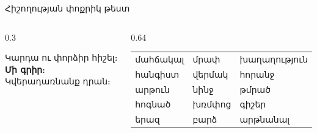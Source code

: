 
\begin{frame}{Հիշողության փոքրիկ թեստ}
  \begin{columns}[c]
    \begin{column}{0.3\textwidth}
      \centering
      \par\medskip
      Կարդա ու փորձիր հիշել։\\ \textbf{Մի գրիր}։\\ Կվերադառնանք դրան։
    \end{column}
    \begin{column}{0.64\textwidth}
      \begin{card}
        \large
        \begin{tabular}{@{}lll@{}}
          մահճակալ & մրափ & խաղաղություն\\[1.4mm]
          հանգիստ & վերմակ & հորանջ\\[1.4mm]
          արթուն & նինջ & թմրած\\[1.4mm]
          հոգնած & խռմփոց & գիշեր\\[1.4mm]
          երազ & բարձ & արթնանալ
        \end{tabular}
      \end{card}
    \end{column}
  \end{columns}
\end{frame}


